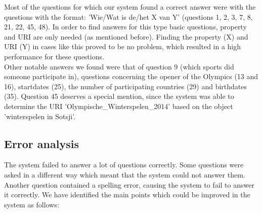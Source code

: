 \documentclass[a4paper,11pt]{article}
\begin{document}
Most of the questions for which our system found a correct answer were with the questions with the format: 'Wie/Wat is de/het X van Y' (questions 1, 2, 3, 7, 8, 21, 22, 45, 48). In order to find answers for this type basic questions, property and URI are only needed (as mentioned before). Finding the property (X) and URI (Y) in cases like this proved to be no problem, which resulted in a high performance for these questions.\vspace{3mm}\\
Other notable answers we found were that of question 9 (which sports did someone participate in), questions concerning the opener of the Olympics (13 and 16), startdates (25), the number of participating countries (29) and birthdates (35). Question 45 deserves a special mention, since the system was able to determine the URI 'Olympische\_Winterspelen\_2014' based on the object 'winterspelen in Sotsji'.

%
%
%
%
%
%
%


\subsection{Error analysis}
The system failed to answer a lot of questions correctly. Some questions were asked in a different way which meant that the system could not answer them. Another question contained a spelling error, causing the system to fail to answer it correctly. We have identified the main points which could be improved in the system as follows:%
\end{document}
